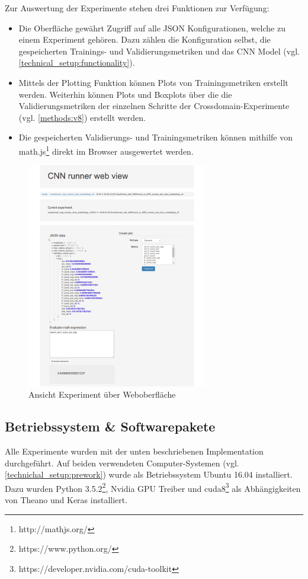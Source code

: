 Zur Auswertung der Experimente stehen drei Funktionen zur Verfügung:
\begin{itemize}
	\item Die Oberfläche gewährt Zugriff auf alle JSON Konfigurationen, welche zu einem Experiment gehören. Dazu zählen die Konfiguration selbst, die gespeicherten Trainings- und Validierungsmetriken und das CNN Model (vgl. \ref{technical_setup:functionality}).
	\item Mittels der Plotting Funktion können Plots von Trainingsmetriken erstellt werden. Weiterhin können Plots und Boxplots über die die Validierungsmetriken der einzelnen Schritte der Crossdomain-Experimente (vgl. \ref{methods:v8}) erstellt werden.
	\item Die gespeicherten Validierungs- und Trainingsmetriken können mithilfe von math.js\footnote{http://mathjs.org/} direkt im Browser ausgewertet werden.
\end{itemize}
\begin{figure}[H]
	\centering
	\includegraphics[width=0.7\textwidth]{img/web_gui}
	\caption{Ansicht Experiment über Weboberfläche}
	\label{fig:web_gui}
\end{figure}
\subsection{Betriebssystem \& Softwarepakete}
\label{technical_setup:software}
Alle Experimente wurden mit der unten beschriebenen Implementation durchgeführt. Auf beiden verwendeten Computer-Systemen (vgl. \ref{technichal_setup:prework}) wurde als Betriebssystem Ubuntu 16.04 installiert. Dazu wurden Python 3.5.2\footnote{https://www.python.org/}, Nvidia GPU Treiber und cuda8\footnote{https://developer.nvidia.com/cuda-toolkit} als Abhängigkeiten von Theano und Keras installiert.

